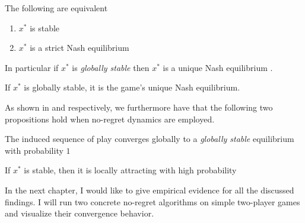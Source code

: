 \begin{proposition}\label{prop:StrictStableEquivalent}
    The following are equivalent
    \begin{enumerate}
        \item $x^*$ is stable
        \item $x^*$ is a strict Nash equilibrium
    \end{enumerate}
\end{proposition}
    
In particular if $x^*$ is \textit{globally stable} then $x^*$ is a unique Nash equilibrium \cite[Prop.2.5]{mertikopoulos}.

\begin{proposition}\label{prop:GloballyStableUniqueNE}
    If $x^*$ is globally stable, it is the game’s unique Nash equilibrium.
\end{proposition}

As shown in \cite[Theorem 4.7]{mertikopoulos} and \cite[Theorem 4.11]{mertikopoulos} respectively, we furthermore have that the following two propositions hold when no-regret dynamics are employed.

\begin{proposition}\label{prop:globalConvergence}
    The induced sequence of play converges globally to a \textit{globally stable} equilibrium with probability $1$
\end{proposition}

\begin{proposition}\label{prop:localConvergence}
    If $x^*$ is stable, then it is locally attracting with high probability
\end{proposition}


In the next chapter, I would like to give empirical evidence for all the discussed findings. I will run two concrete no-regret algorithms on simple two-player games and visualize their convergence behavior.